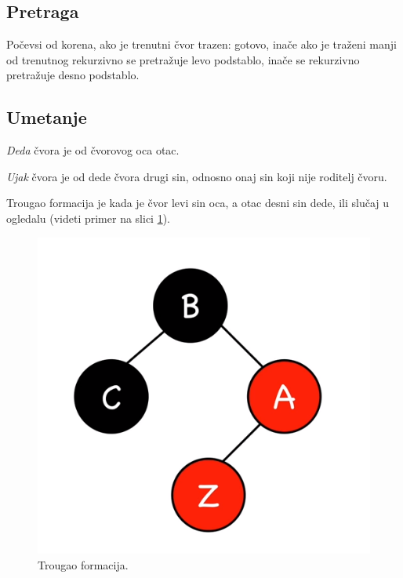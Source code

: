 \documentclass[a4paper]{article}
\begin{document}
\subsection{Pretraga}

Počevsi od korena, ako je trenutni čvor trazen: gotovo, inače ako
je traženi manji od trenutnog rekurzivno se pretražuje levo podstablo, inače se rekurzivno pretražuje desno podstablo.

\subsection{Umetanje}
\textit{Deda} čvora je od čvorovog oca otac.

\textit{Ujak} čvora je od dede čvora drugi sin, odnosno onaj sin koji nije roditelj čvoru.

    Trougao formacija je kada je čvor levi sin oca, a otac desni sin dede, ili slučaj u ogledalu 
    (videti primer na slici \ref{fig:triangle}).
    \begin{figure}[h!]
        \begin{center}
        \includegraphics[scale=0.3]{triangle.png}
        \end{center}
        \caption{Trougao formacija.}
        \label{fig:triangle}
    \end{figure}
\end{document}

